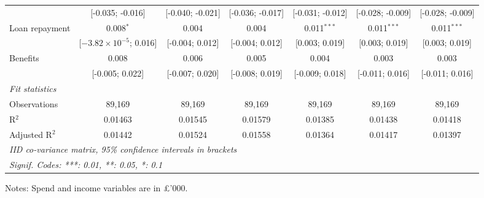 \begin{table}[htbp]
\begin{threeparttable}[b]
\begin{tabular}{lcccccc}
                                   & [-0.035; -0.016]                & [-0.040; -0.021] & [-0.036; -0.017]  & [-0.031; -0.012]                & [-0.028; -0.009]  & [-0.028; -0.009]\\   
         Loan repayment            & 0.008$^{*}$                     & 0.004            & 0.004             & 0.011$^{***}$                   & 0.011$^{***}$     & 0.011$^{***}$\\   
                                   & [$-3.82\times 10^{-5}$; 0.016]  & [-0.004; 0.012]  & [-0.004; 0.012]   & [0.003; 0.019]                  & [0.003; 0.019]    & [0.003; 0.019]\\   
         Benefits                  & 0.008                           & 0.006            & 0.005             & 0.004                           & 0.003             & 0.003\\   
                                   & [-0.005; 0.022]                 & [-0.007; 0.020]  & [-0.008; 0.019]   & [-0.009; 0.018]                 & [-0.011; 0.016]   & [-0.011; 0.016]\\   
         \midrule
         \emph{Fit statistics}\\
         Observations              & 89,169                          & 89,169           & 89,169            & 89,169                          & 89,169            & 89,169\\  
         R$^2$                     & 0.01463                         & 0.01545          & 0.01579           & 0.01385                         & 0.01438           & 0.01418\\  
         Adjusted R$^2$            & 0.01442                         & 0.01524          & 0.01558           & 0.01364                         & 0.01417           & 0.01397\\  
         \midrule \midrule
         \multicolumn{7}{l}{\emph{IID co-variance matrix, 95\% confidence intervals in brackets}}\\
         \multicolumn{7}{l}{\emph{Signif. Codes: ***: 0.01, **: 0.05, *: 0.1}}\\
      \end{tabular}
      
      \begin{tablenotes}\footnotesize
         \item Notes: Spend and income variables are in \pounds'000.
      \end{tablenotes}
   \end{threeparttable}
\end{table}


